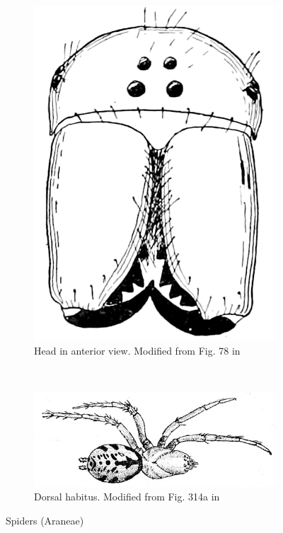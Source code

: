 \documentclass[letterpaper, 11pt]{article}
\begin{document}
\begin{figure}[ht!]
    \centering
    \begin{subfigure}[ht!]{0.22\textwidth}
        \includegraphics[width=\textwidth]{spider78.png}
        \caption{Head in anterior view. Modified from Fig. 78 in \cite{bhlitem21199comstock}}
        \label{fig:fang}
    \end{subfigure}
    ~ %
    \begin{subfigure}[ht!]{0.7\textwidth}
        \includegraphics[width=\textwidth]{spider314a.png}
        \caption{Dorsal habitus. Modified from Fig. 314a in \cite{bhlitem21199comstock}}
        \label{fig:spider}
    \end{subfigure}
    \caption{Spiders (Araneae)}\label{fig:spiders}
\end{figure}
\end{document}
